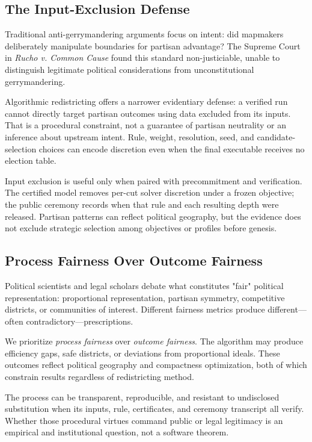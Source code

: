 \subsection{The Input-Exclusion Defense}

Traditional anti-gerrymandering arguments focus on intent: did mapmakers deliberately manipulate boundaries for partisan advantage? The Supreme Court in \textit{Rucho v. Common Cause} found this standard non-justiciable, unable to distinguish legitimate political considerations from unconstitutional gerrymandering.

Algorithmic redistricting offers a narrower evidentiary defense: a verified run
cannot directly target partisan outcomes using data excluded from its inputs.
That is a procedural constraint, not a guarantee of partisan neutrality or an
inference about upstream intent. Rule, weight, resolution, seed, and candidate-
selection choices can encode discretion even when the final executable receives
no election table.

Input exclusion is useful only when paired with precommitment and verification.
The certified model removes per-cut solver discretion under a frozen objective;
the public ceremony records when that rule and each resulting depth were
released. Partisan patterns can reflect political geography, but the evidence
does not exclude strategic selection among objectives or profiles before
genesis.

\subsection{Process Fairness Over Outcome Fairness}

Political scientists and legal scholars debate what constitutes "fair" political representation: proportional representation, partisan symmetry, competitive districts, or communities of interest. Different fairness metrics produce different—often contradictory—prescriptions.

We prioritize \textit{process fairness} over \textit{outcome fairness}. The algorithm may produce efficiency gaps, safe districts, or deviations from proportional ideals. These outcomes reflect political geography and compactness optimization, both of which constrain results regardless of redistricting method.

The process can be transparent, reproducible, and resistant to undisclosed
substitution when its inputs, rule, certificates, and ceremony transcript all
verify. Whether those procedural virtues command public or legal legitimacy is
an empirical and institutional question, not a software theorem.

